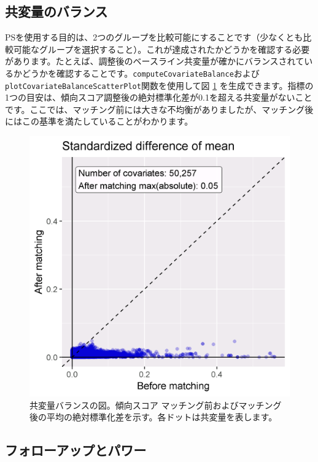 \documentclass[
  11pt]{book}
\theoremstyle{definition}
\theoremstyle{definition}
\theoremstyle{definition}
\theoremstyle{definition}
\theoremstyle{remark}
\begin{document}
\subsection{共変量のバランス}\label{ux5171ux5909ux91cfux306eux30d0ux30e9ux30f3ux30b9}

PSを使用する目的は、2つのグループを比較可能にすることです（少なくとも比較可能なグループを選択すること）。これが達成されたかどうかを確認する必要があります。たとえば、調整後のベースライン共変量が確かにバランスされているかどうかを確認することです。\texttt{computeCovariateBalance}および\texttt{plotCovariateBalanceScatterPlot}関数を使用して図 \ref{fig:balance} を生成できます。指標の1つの目安は、傾向スコア調整後の絶対標準化差が0.1を超える共変量がないことです。ここでは、マッチング前には大きな不均衡がありましたが、マッチング後にはこの基準を満たしていることがわかります。 

\begin{figure}

{\centering \includegraphics[width=0.7\linewidth]{images/PopulationLevelEstimation/balance} 

}

\caption{共変量バランスの図。傾向スコア マッチング前およびマッチング後の平均の絶対標準化差を示す。各ドットは共変量を表します。}\label{fig:balance}
\end{figure}

\subsection{フォローアップとパワー}\label{ux30d5ux30a9ux30edux30fcux30a2ux30c3ux30d7ux3068ux30d1ux30efux30fc}
\end{document}
